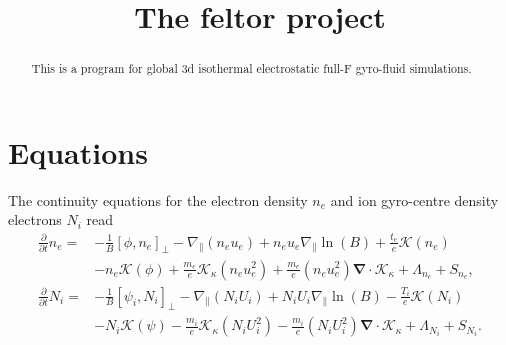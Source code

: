 \documentclass{hitec} %
\renewcommand{\vec}[1]{\boldsymbol{#1}}
\begin{document}
\title{The feltor project}
\maketitle

\begin{abstract}
This is a program for global 3d isothermal electrostatic full-F gyro-fluid simulations.
\end{abstract}

\section{Equations}
The continuity equations for the electron density \(n_e\) and  ion gyro-centre density electrons  \(N_i\) read
\begin{align}
 \frac{\partial}{\partial t}n_e =&
 - \frac{1}{B}\left[\phi,  n_e \right]_{\perp}
 -  {\nabla}_{\parallel}( n_e u_e)
 + n_e u_e   {\nabla}_{\parallel} \ln{(B)}
+ \frac{t_e }{e }  \mathcal{K} \left( n_e\right)
\nonumber  \\ &
-   n_e \mathcal{K}(\phi)
   +  \frac{m_e }{ e } \mathcal{K}_{\kappa} \left( n_e u_e^2 \right)
   + \frac{m_e }{ e } \left( n_e u_e^2 \right) \vec{\nabla} \cdot  \vec{\mathcal{K}}_{\kappa}
   + \Lambda_{n_e} + S_{n_e},\\
\frac{\partial}{\partial t}N_i =&
 - \frac{1}{B}\left[\psi_i,  N_i \right]_{\perp}
 - {\nabla}_{\parallel}(N_i U_i)
 + N_i U_i   {\nabla}_{\parallel} \ln{(B)}
- \frac{T_i }{e }  \mathcal{K} \left( N_i\right)
\nonumber  \\ &
-   N_i \mathcal{K}(\psi)
- \frac{m_i }{ e }\mathcal{K}_{\kappa}  \left( N_i U_i^2 \right)
- \frac{m_i }{ e } \left( N_i U_i^2 \right)\vec{\nabla} \cdot  \vec{\mathcal{K}}_{\kappa}
+ \Lambda_{N_i} + S_{N_i}.
\end{align}
\end{document}
